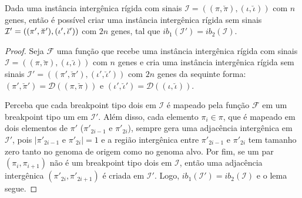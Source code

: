 

\begin{lemma}\label{lemma:FKOCCOYY}
Dada uma instância intergênica rígida com sinais $\mathcal{I}=((\pi,\breve\pi),(\iota,\breve\iota))$ com $n$ genes, então é possível criar uma instância intergênica rígida sem sinais $\mathcal{I'}=((\pi',\breve\pi'),\break(\iota',\breve\iota'))$ com $2n$ genes, tal que $ib_1(\mathcal{I'}) = ib_2(\mathcal{I})$.
\end{lemma}
\begin{proof}
Seja $\mathcal{F}$ uma função que recebe uma instância intergênica rígida com sinais $\mathcal{I}=((\pi,\breve\pi),(\iota,\breve\iota))$ com $n$ genes e cria uma instância intergênica rígida sem sinais $\mathcal{I'}=((\pi',\breve\pi'),(\iota',\breve\iota'))$ com $2n$ genes da sequinte forma: $(\pi',\breve\pi') = \mathcal{D}((\pi,\breve\pi))$ e $(\iota',\breve\iota') = \mathcal{D}((\iota,\breve\iota))$.

Perceba que cada breakpoint tipo dois em $\mathcal{I}$ é mapeado pela função $\mathcal{F}$ em um breakpoint tipo um em $\mathcal{I'}$. Além disso, cada elemento $\pi_i \in \pi$, que é mapeado em dois elementos de $\pi'$ ($\pi'_{2i-1}$ e $\pi'_{2i}$), sempre gera uma adjacência intergênica em $\mathcal{I'}$, pois $|\pi'_{2i-1}$ e $\pi'_{2i}| = 1$ e a região intergênica entre $\pi'_{2i-1}$ e $\pi'_{2i}$ tem tamanho zero tanto no genoma de origem como no genoma alvo. Por fim, se um par $(\pi_{i},\pi_{i+1})$ não é um breakpoint tipo dois em $\mathcal{I}$, então uma adjacência intergênica $(\pi'_{2i},\pi'_{2i+1})$ é criada em $\mathcal{I'}$. Logo, $ib_1(\mathcal{I'}) = ib_2(\mathcal{I})$ e o lema segue.
\end{proof}

